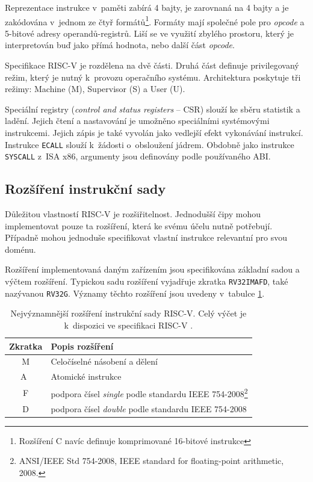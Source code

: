 Reprezentace instrukce v~paměti zabírá 4 bajty, je zarovnaná na 4 bajty a je zakódována v~jednom ze čtyř formátů\footnote{Rozšíření C navíc definuje komprimované 16-bitové instrukce}.
Formáty mají společné pole pro \emph{opcode} a 5-bitové adresy operandů-registrů.
Liší se ve využití zbylého prostoru, který je interpretován buď jako přímá hodnota, nebo další část \emph{opcode}. \cite{riscvspec}

Specifikace RISC-V je rozdělena na dvě části.
Druhá část definuje privilegovaný režim, který je nutný k~provozu operačního systému.
Architektura poskytuje tři režimy: Machine (M), Supervisor (S) a User (U).

Speciální registry (\emph{control and status registers} -- CSR) slouží ke sběru statistik a ladění.
Jejich čtení a nastavování je umožněno speciálními systémovými instrukcemi.
Jejich zápis je také vyvolán jako vedlejší efekt vykonávání instrukcí.
Instrukce \texttt{ECALL} slouží k~žádosti o~obsloužení jádrem.
Obdobně jako instrukce \texttt{SYSCALL} z~ISA x86, argumenty jsou definovány podle používaného ABI.

\subsection{Rozšíření instrukční sady}
Důležitou vlastností RISC-V je rozšiřitelnost.
Jednodušší čipy mohou implementovat pouze ta rozšíření, která ke svému účelu nutně potřebují.
Případně mohou jednoduše specifikovat vlastní instrukce relevantní pro svou doménu.

Rozšíření implementovaná daným zařízením jsou specifikována základní sadou a výčtem rozšíření.
Typickou sadu rozšíření vyjadřuje zkratka \texttt{RV32IMAFD}, také nazývanou \texttt{RV32G}.
Významy těchto rozšíření jsou uvedeny v~tabulce \ref{table:extensions}.

\begin{table}[ht]
\centering
\begin{tabular}{|c|l|}
\hline
Zkratka  & Popis rozšíření             \\ \hline\hline
M          & Celočíselné násobení a dělení     \\ \hline
A~& Atomické instrukce     \\ \hline
F         & podpora čísel \emph{single} podle standardu IEEE 754-2008\footnote{ANSI/IEEE Std 754-2008, IEEE standard for floating-point arithmetic, 2008.}     \\ \hline
D         & podpora čísel \emph{double} podle standardu IEEE 754-2008     \\ \hline
\end{tabular}
\caption{Nejvýznamnější rozšíření instrukční sady RISC-V. Celý výčet je k~dispozici ve specifikaci RISC-V \cite{riscvspec}.}
\label{table:extensions}
\end{table}

